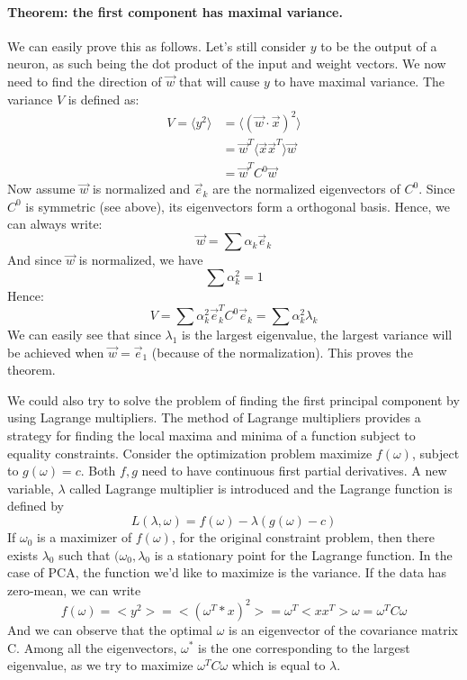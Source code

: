 \documentclass[11pt]{article}
\begin{document}
\paragraph{Theorem: the first component has maximal variance.}
We can easily prove this as follows. Let's still consider $y$ to be the output of a neuron, as such being the dot product of the input and weight vectors. We now need to find the direction of $\vec{w}$ that will cause $y$ to have maximal variance.
The variance $V$ is defined as:
\begin{align*}
V = \langle y^2 \rangle &= \langle (\vec{w}\cdot\vec{x})^2\rangle \\
&=\vec{w}^T \langle\vec{x}\vec{x}^T\rangle\vec{w} \\
&= \vec{w}^T C^0 \vec{w}
\end{align*} 
Now assume $\vec{w}$ is normalized and $\vec{e}_k$ are the normalized eigenvectors of $C^0$. Since $C^0$ is symmetric (see above), its eigenvectors form a orthogonal basis. Hence, we can always write:
\[\vec{w} = \sum \alpha_k \vec{e}_k \]
And since $\vec{w}$ is normalized, we have
\[\sum \alpha_k^2 = 1\]
Hence:
\[ V = \sum \alpha_k^2\vec{e}_k^T C^0 \vec{e}_k = \sum \alpha_k^2\lambda_k\]
We can easily see that since $\lambda_1$ is the largest eigenvalue, the largest variance will be achieved when $\vec{w} = \vec{e}_1$ (because of the normalization). This proves the theorem.

We could also try to solve the problem of finding the first principal component by using Lagrange multipliers. The method of Lagrange multipliers provides a strategy for finding the local maxima and minima of a function subject to equality constraints. Consider the optimization problem maximize $f(\omega)$, subject to $g(\omega) = c$. Both $f,g$ need to have continuous first partial derivatives. A new variable, $\lambda$ called Lagrange multiplier is introduced and the Lagrange function is defined by
\[
	L(\lambda, \omega) = f(\omega) - \lambda(g(\omega) - c)
\]
If $\omega_0$ is a maximizer of $f(\omega)$, for the original constraint problem, then there exists $\lambda_0$ such that $(\omega_0, \lambda_0$ is a stationary point for the Lagrange function. In the case of PCA, the function we'd like to maximize is the variance. If the data has zero-mean, we can write
\[
	f(\omega) = < y^2 > = < (\omega^T * x)^2 > = \omega^T <x x^T> \omega = \omega^T C \omega
\]
And we can observe that the optimal $\omega$ is an eigenvector of the covariance matrix C. Among all the eigenvectors, $\omega^*$ is the one corresponding to the largest eigenvalue, as we try to maximize $\omega^T C \omega$ which is equal to $\lambda$.
\end{document}
